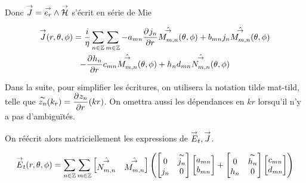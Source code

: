         Donc \(\vJ = \vect{e_r} \pvect \vH\) s'écrit en série de Mie

        \begin{multline}
            \vJ(\rtp) = \frac{i}{\eta}\sum_{n\in\ZZ}\sum_{m\in\ZZ} - a_{mn} \ddr{r}{j_n}\hat{\Mmn}(\tp) + b_{mn} j_n \hat{\Mmn}(\tp)
            \\
            -  \ddr{r}{h_n} c_{mn} \hat{\Mmn}(\tp) + h_n d_{mn} \hat{\Nmn}(\tp)
        \end{multline}

        Dans la suite, pour simplifier les écritures, on utilisera la notation tilde \gls{mat-tild}, telle que \( \tilde{z_n}(k_r) = \ddr{r}{z_n}(kr) \). On omettra aussi les dépendances en \(kr\) lorsqu'il n'y a pas d’ambiguïtés.

        On réécrit alors matriciellement les expressions de \(\vE_t,\vJ\).

        \begin{equation}
            \vE_t(\rtp) = \sum_{n\in\ZZ}\sum_{m\in\ZZ}
            \begin{bmatrix}
              \hat{\Nmn} & \hat{\Mmn}
            \end{bmatrix}
            \left( 
              \begin{bmatrix}
                  0 & \tilde{j_n}
                  \\
                  j_n & 0
              \end{bmatrix}
              \begin{bmatrix}
                  a_{mn}
                  \\
                  b_{mn}
              \end{bmatrix}
              + 
              \begin{bmatrix}
                  0 & \tilde{h_n}
                  \\
                  h_n & 0
              \end{bmatrix}
              \begin{bmatrix}
                  c_{mn}
                  \\
                  d_{mn}
              \end{bmatrix}
            \right)
        \end{equation}


